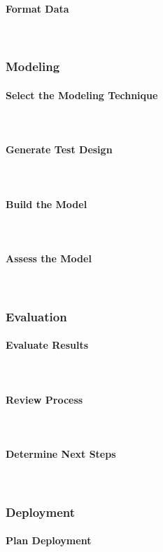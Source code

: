 \paragraph{Format Data}\mbox{} \\
\subsubsection{Modeling}
\paragraph{Select the Modeling Technique}\mbox{} \\
\paragraph{Generate Test Design}\mbox{} \\
\paragraph{Build the Model}\mbox{} \\
\paragraph{Assess the Model}\mbox{} \\


\subsubsection{Evaluation}
\paragraph{Evaluate Results}\mbox{} \\
\paragraph{Review Process}\mbox{} \\
\paragraph{Determine Next Steps}\mbox{} \\

\subsubsection{Deployment}
\paragraph{Plan Deployment}\mbox{} \\
